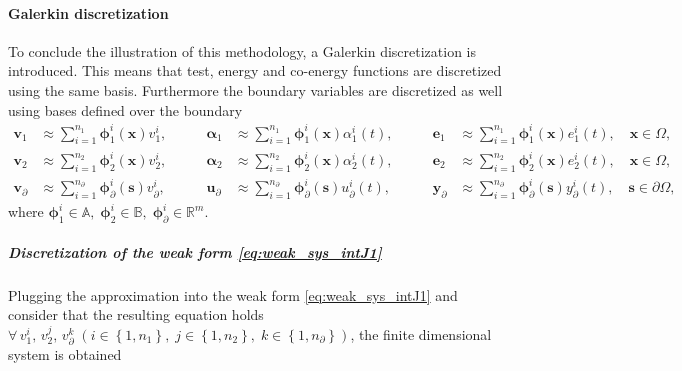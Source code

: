 \paragraph{Galerkin discretization}
To conclude the illustration of this methodology, a Galerkin discretization is introduced. This means that test, energy and co-energy functions are discretized using the same basis. Furthermore the boundary variables are discretized as well using bases defined over the boundary
\begin{equation}\label{eq:approx_vaeb}
\begin{aligned}
\bm{v}_1 &\approx \sum_{i=1}^{n_1} \bm{\phi}_1^i(\bm{x}) v_1^i, \\
\bm{v}_2 &\approx \sum_{i=1}^{n_2} \bm{\phi}_2^i(\bm{x}) v_2^i, \\
\bm{v}_\partial &\approx \sum_{i=1}^{n_\partial} \bm{\phi}_\partial^i(\bm{s}) v_\partial^i,
\end{aligned} \qquad 
\begin{aligned}
\bm{\alpha}_1 &\approx \sum_{i=1}^{n_1} \bm{\phi}_1^i(\bm{x}) \alpha_1^i(t), \\
\bm{\alpha}_2 &\approx \sum_{i=1}^{n_2} \bm{\phi}_2^i(\bm{x}) \alpha_2^i(t), \\
\bm{u}_\partial &\approx \sum_{i=1}^{n_\partial} \bm{\phi}_\partial^i(\bm{s}) u_\partial^i(t), 
\end{aligned} \qquad 
\begin{aligned}
\bm{e}_1 &\approx \sum_{i=1}^{n_1} \bm{\phi}_1^i(\bm{x}) e_1^i(t), \quad \bm{x} \in \Omega, \\
\bm{e}_2 &\approx \sum_{i=1}^{n_2} \bm{\phi}_2^i(\bm{x}) e_2^i(t), \quad \bm{x} \in \Omega,\\
\bm{y}_\partial &\approx \sum_{i=1}^{n_\partial} \bm{\phi}_\partial^i(\bm{s}) y_\partial^i(t), \quad \bm{s} \in \partial\Omega,
\end{aligned}
\end{equation}
where $\bm{\phi}_1^i  \in \mathbb{A}, \; \bm{\phi}_2^i  \in \mathbb{B}, \; \bm{\phi}_\partial^i \in \mathbb{R}^m$.
\subparagraph{Discretization of the weak form \eqref{eq:weak_sys_intJ1}}
Plugging the approximation into the weak form \eqref{eq:weak_sys_intJ1} and consider that the resulting equation holds $\forall \, v_1^i,\, v_2^j,\, v_\partial^k \; (i\in\left\{1,n_1\right\}, \; j\in\left\{1,n_2\right\}, \; k\in\left\{1,n_\partial\right\})$, the finite dimensional system is obtained

